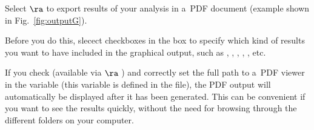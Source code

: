 \s Select  $\ra$  to export results of your analysis in a~PDF document (example shown in Fig.~\ref{fig:outputG}). 

\nb
\bul Before you do this, slecect checkboxes in the  box to specify which kind of results you want to have included in the graphical output, such as  , , , , , etc.

\bul If you check  (available via  $\ra$ ) and correctly set the full path to a~PDF viewer in the  variable (this variable is defined in the  file), the PDF output will automatically be displayed after it has been generated. This can be convenient if you want to see the results quickly, without the need for browsing through the different folders on your computer.

